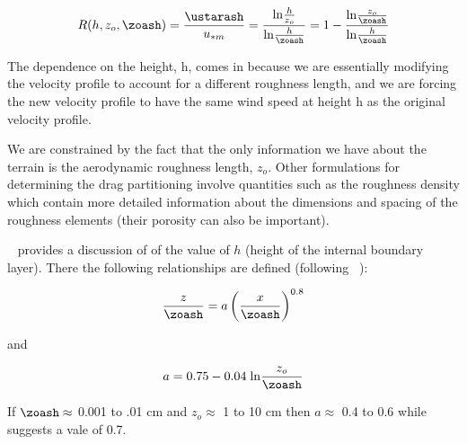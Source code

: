 

\begin{equation}
R(h, z_o, \zoash) = \frac{\ustarash}{u_{*m}} = \frac{\mathrm{ln}\frac{h}{z_o}}{\mathrm{ln}\frac{h}{\zoash}} = 1 - \frac{\mathrm{ln}\frac{z_o}{\zoash}}{\mathrm{ln}\frac{h}{\zoash}} 
\label{eq:2}
\end{equation}

The dependence on the height, h, comes in because we are essentially modifying the velocity profile to account for a different roughness length, and we
are forcing the new velocity profile to have the same wind speed at height h as the original velocity profile.

We are constrained by the fact that the only information we have about the terrain is the aerodynamic roughness length, $z_o$. Other formulations for determining the drag partitioning involve quantities such as the roughness density which contain more detailed information about the dimensions and spacing of the roughness elements (their porosity can also be important).

~\cite{King05} provides a discussion of of the value of $h$ (height of the internal boundary layer).
There the following relationships are defined (following ~\citep{Elliot58, Pendergrass84, Marticorena95}):

\begin{equation}
\frac{z}{\zoash} = a\left(\frac{x}{\zoash}\right)^{0.8}
\label{eq:9}
\end{equation}

and

\begin{equation}
a = 0.75-0.04\;\mathrm{ln}\frac{z_o}{\zoash}
\label{eq:10}
\end{equation}

If $\zoash \approx$ 0.001 to .01 $\mathrm{cm}$ and  $z_o \approx$ 1 to 10 $\mathrm{cm}$ then $a \approx$ 0.4  to  0.6 while
 ~\cite{King05} suggests a vale of 0.7.


